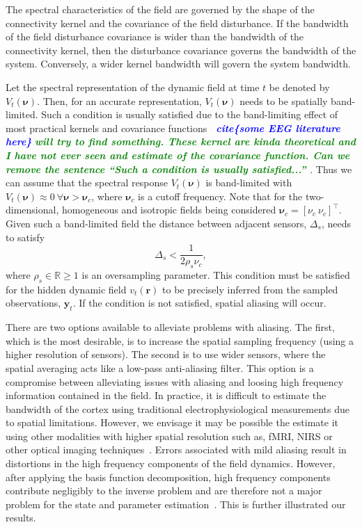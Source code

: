 \documentclass[12pt]{iopart}
\newcommand{\todo}[1]{\textsf{\emph{\textbf{\textcolor{blue}{#1}}}}}
\newcommand{\omg}[1]{\textsf{\emph{\textbf{\textcolor{green}{#1}}}}}
\begin{document}
The spectral characteristics of the field are governed by the shape of the connectivity kernel and the covariance of the field disturbance. If the bandwidth of the field disturbance covariance is wider than the bandwidth of the connectivity kernel, then the disturbance covariance governs the bandwidth of the system. Conversely, a wider kernel bandwidth will govern the system bandwidth.

Let the spectral representation of the dynamic field at time $t$ be denoted by $V_t(\boldsymbol{\nu})$. Then, for an accurate representation, $V_t(\boldsymbol{\nu})$ needs to be spatially band-limited. Such a condition is usually satisfied due to the band-limiting effect of most practical kernels and covariance functions \todo{~cite\{some EEG literature here\}} \omg{will try to find something. These kernel are kinda theoretical and I have not ever seen and estimate of the covariance function. Can we remove the sentence ``Such a condition is usually satisfied...'' }. Thus we can assume that the spectral response $V_t(\boldsymbol{\nu})$ is band-limited with $V_t(\boldsymbol{\nu}) \approx 0 ~ \forall \boldsymbol{\nu} > \boldsymbol{\nu}_c$, where $\boldsymbol{\nu}_c$ is a cutoff frequency. Note that for the two-dimensional, homogeneous and isotropic fields being considered $\boldsymbol{\nu}_c = [\nu_c ~ \nu_c]^\top$. Given such a band-limited field the distance between adjacent sensors, $\Delta_s$, needs to satisfy 
\begin{equation}
	\label{eq:MinimumSensorDistance} \Delta_s < \frac{1}{2\rho_s\nu_{c}}, 
\end{equation}
where $\rho_s \in \mathbb{R} \ge 1$ is an oversampling parameter. This condition must be satisfied for the hidden dynamic field $v_t(\mathbf{r})$ to be precisely inferred from the sampled observations, $\mathbf{y}_t$. If the condition is not satisfied, spatial aliasing will occur. 

There are two options available to alleviate problems with aliasing. The first, which is the most desirable, is to increase the spatial sampling frequency (using a higher resolution of sensors). The second is to use wider sensors, where the spatial averaging acts like a low-pass anti-aliasing filter. This option is a compromise between alleviating issues with aliasing and loosing high frequency information contained in the field. In practice, it is difficult  to estimate the bandwidth of the cortex using traditional electrophysiological measurements due to spatial limitations. However, we envisage it may be possible the estimate it using other modalities with higher spatial resolution such as, fMRI, NIRS or other optical imaging techniques~\cite{Issa2000}. Errors associated with mild aliasing result in distortions in the high frequency components of the field dynamics. However, after applying the basis function decomposition, high frequency components contribute negligibly to the inverse problem and are therefore not a major problem for the state and parameter estimation~\cite{Sanner1992}. This is further illustrated our results.
\end{document}
